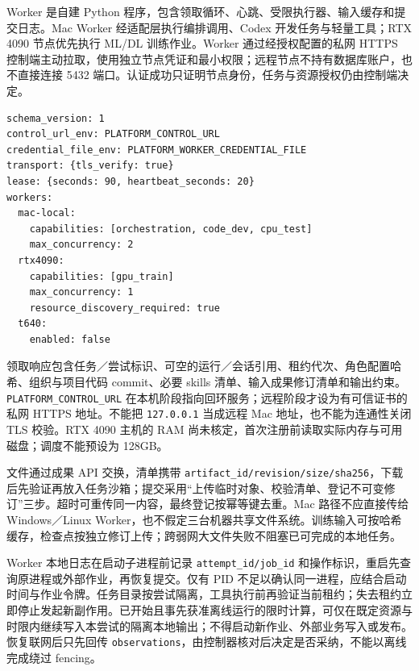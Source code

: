\documentclass[11pt,a4paper]{article}
\begin{document}
Worker 是自建 Python 程序，包含领取循环、心跳、受限执行器、输入缓存和提交日志。Mac Worker 经适配层执行编排调用、Codex 开发任务与轻量工具；RTX 4090 节点优先执行 ML/DL 训练作业。Worker 通过经授权配置的私网 HTTPS 控制端主动拉取，使用独立节点凭证和最小权限；远程节点不持有数据库账户，也不直接连接 5432 端口。认证成功只证明节点身份，任务与资源授权仍由控制端决定。

\par\noindent\begin{minipage}{\linewidth}
\begin{lstlisting}[caption={workers.yaml 的最小配置片段；私网入口需实施时配置}]
schema_version: 1
control_url_env: PLATFORM_CONTROL_URL
credential_file_env: PLATFORM_WORKER_CREDENTIAL_FILE
transport: {tls_verify: true}
lease: {seconds: 90, heartbeat_seconds: 20}
workers:
  mac-local:
    capabilities: [orchestration, code_dev, cpu_test]
    max_concurrency: 2
  rtx4090:
    capabilities: [gpu_train]
    max_concurrency: 1
    resource_discovery_required: true
  t640:
    enabled: false
\end{lstlisting}
\end{minipage}\par


领取响应包含任务／尝试标识、可空的运行／会话引用、租约代次、角色配置哈希、组织与项目代码 commit、必要 skills 清单、输入成果修订清单和输出约束。\texttt{PLATFORM\_\allowbreak CONTROL\_URL} 在本机阶段指向回环服务；远程阶段才设为有可信证书的私网 HTTPS 地址。不能把 \texttt{127.0.0.1} 当成远程 Mac 地址，也不能为连通性关闭 TLS 校验。RTX 4090 主机的 RAM 尚未核定，首次注册前读取实际内存与可用磁盘；调度不能预设为 128GB。

文件通过成果 API 交换，清单携带 \texttt{artifact\_id/revision/size/sha256}，下载后先验证再放入任务沙箱；提交采用“上传临时对象、校验清单、登记不可变修订”三步。超时可重传同一内容，最终登记按幂等键去重。Mac 路径不应直接传给 Windows／Linux Worker，也不假定三台机器共享文件系统。训练输入可按哈希缓存，检查点按独立修订上传；跨弱网大文件失败不阻塞已可完成的本地任务。

Worker 本地日志在启动子进程前记录 \texttt{attempt\_id/job\_id} 和操作标识，重启先查询原进程或外部作业，再恢复提交。仅有 PID 不足以确认同一进程，应结合启动时间与作业令牌。任务目录按尝试隔离，工具执行前再验证当前租约；失去租约立即停止发起新副作用。已开始且事先获准离线运行的限时计算，可仅在既定资源与时限内继续写入本尝试的隔离本地输出；不得启动新作业、外部业务写入或发布。恢复联网后只先回传 \texttt{observations}，由控制器核对后决定是否采纳，不能以离线完成绕过 fencing。
\end{document}
